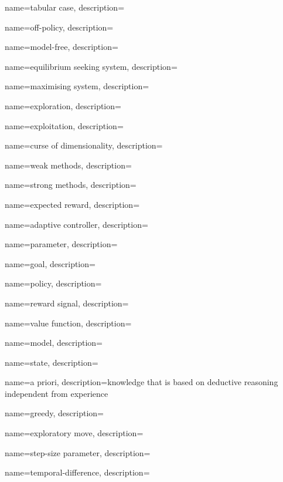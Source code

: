 {
    name={tabular case},
    description={}
}

{
    name={off-policy},
    description={}
}

{
    name={model-free},
    description={}
}

{
    name={equilibrium seeking system},
    description={}
}

{
    name={maximising system},
    description={}
}

{
    name={exploration},
    description={}
}

{
    name={exploitation},
    description={}
}

{
    name={curse of dimensionality},
    description={}
}

{
    name={weak methods},
    description={}
}

{
    name={strong methods},
    description={}
}

{
    name={expected reward},
    description={}
}

{
    name={adaptive controller},
    description={}
}

{
    name={parameter},
    description={}
}

{
    name={goal},
    description={}
}

{
    name={policy},
    description={}
}

{
    name={reward signal},
    description={}
}

{
    name={value function},
    description={}
}

{
    name={model},
    description={}
}

{
    name={state},
    description={}
}

{
    name={a priori},
    description={knowledge that is based on deductive reasoning independent
    from experience}
}

{
    name={greedy},
    description={}
}

{
    name={exploratory move},
    description={}
}

{
    name={step-size parameter},
    description={}
}

{
    name={temporal-difference},
    description={}
}

